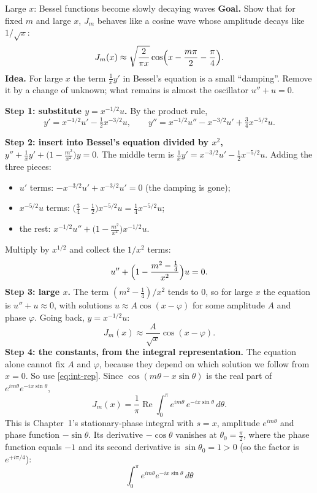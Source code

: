 \documentclass[11pt]{beamer}
\begin{document}
\begin{frame}[allowframebreaks=1.00]{Large $x$: Bessel functions become slowly decaying waves}
\footnotesize
\textbf{Goal.} Show that for fixed \(m\) and large \(x\), \(J_m\) behaves like a cosine wave whose amplitude
decays like \(1/\sqrt x\):
\[
 J_m(x)\approx\sqrt{\frac{2}{\pi x}}\cos\Bigl(x-\frac{m\pi}{2}-\frac\pi4\Bigr).
\]
\textbf{Idea.} For large \(x\) the term \(\frac1xy'\) in Bessel's equation is a small ``damping''. Remove it
by a change of unknown; what remains is almost the oscillator \(u''+u=0\).

\textbf{Step 1: substitute \(y=x^{-1/2}u\).} By the product rule,
\[
 y'=x^{-1/2}u'-\tfrac12x^{-3/2}u,\qquad
 y''=x^{-1/2}u''-x^{-3/2}u'+\tfrac34x^{-5/2}u .
\]


\textbf{Step 2: insert into Bessel's equation divided by \(x^2\),}
\(y''+\frac1xy'+\bigl(1-\frac{m^2}{x^2}\bigr)y=0\). The middle term is
\(\frac1xy'=x^{-3/2}u'-\frac12x^{-5/2}u\). Adding the three pieces:
\begin{itemize}
  \item \(u'\) terms: \(-x^{-3/2}u'+x^{-3/2}u'=0\) (the damping is gone);
  \item \(x^{-5/2}u\) terms: \(\bigl(\frac34-\frac12\bigr)x^{-5/2}u=\frac14x^{-5/2}u\);
  \item the rest: \(x^{-1/2}u''+\bigl(1-\frac{m^2}{x^2}\bigr)x^{-1/2}u\).
\end{itemize}
Multiply by \(x^{1/2}\) and collect the \(1/x^2\) terms:
\[
 u''+\Bigl(1-\frac{m^2-\frac14}{x^2}\Bigr)u=0 .
\]
\textbf{Step 3: large \(x\).} The term \((m^2-\frac14)/x^2\) tends to \(0\), so for large \(x\) the equation
is \(u''+u\approx0\), with solutions \(u\approx A\cos(x-\varphi)\) for some amplitude \(A\) and phase \(\varphi\).
Going back, \(y=x^{-1/2}u\):
\[
 J_m(x)\approx\frac{A}{\sqrt x}\cos(x-\varphi).
\]
\textbf{Step 4: the constants, from the integral representation.} The equation alone cannot fix \(A\) and
\(\varphi\), because they depend on which solution we follow from \(x=0\). So use \eqref{eq:int-rep}. Since
\(\cos(m\theta-x\sin\theta)\) is the real part of \(e^{im\theta}e^{-ix\sin\theta}\),
\[
 J_m(x)=\frac1\pi\operatorname{Re}\int_0^\pi e^{im\theta}\,e^{-ix\sin\theta}\,d\theta .
\]
This is Chapter~1's stationary-phase integral with \(s=x\), amplitude \(e^{im\theta}\) and phase function
\(-\sin\theta\). Its derivative \(-\cos\theta\) vanishes at \(\theta_0=\frac\pi2\), where the phase function equals \(-1\)
and its second derivative is \(\sin\theta_0=1>0\) (so the factor is \(e^{+i\pi/4}\)):
\[
 \int_0^\pi e^{im\theta}e^{-ix\sin\theta}\,d\theta
\]
\end{frame}
\end{document}
